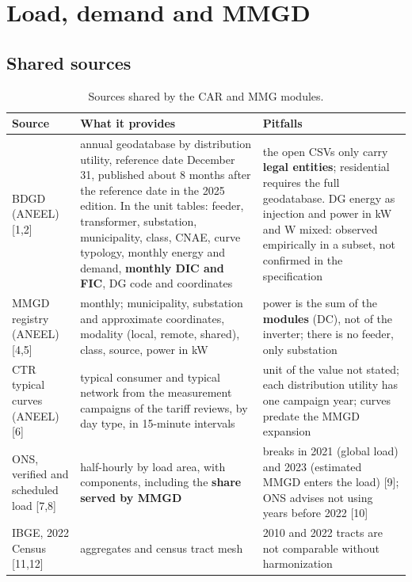 
\section{Load, demand and MMGD}

\subsection*{Shared sources}

\begin{table}[H]
\centering\small
\caption{Sources shared by the CAR and MMG modules.}
\begin{tabularx}{\textwidth}{P{3.2cm} L P{4.2cm}}
\toprule
\textbf{Source} & \textbf{What it provides} & \textbf{Pitfalls} \\
\midrule
BDGD (ANEEL) [1,2] & annual geodatabase by distribution utility, reference date December 31, published about 8 months after the reference date in the 2025 edition. In the unit tables: feeder, transformer, substation, municipality, class, CNAE, curve typology, monthly energy and demand, \textbf{monthly DIC and FIC}, DG code and coordinates & the open CSVs only carry \textbf{legal entities}; residential requires the full geodatabase. DG energy as injection and power in kW and W mixed: observed empirically in a subset, not confirmed in the specification \\
MMGD registry (ANEEL) [4,5] & monthly; municipality, substation and approximate coordinates, modality (local, remote, shared), class, source, power in kW & power is the sum of the \textbf{modules} (DC), not of the inverter; there is no feeder, only substation \\
CTR typical curves (ANEEL) [6] & typical consumer and typical network from the measurement campaigns of the tariff reviews, by day type, in 15-minute intervals & unit of the value not stated; each distribution utility has one campaign year; curves predate the MMGD expansion \\
ONS, verified and scheduled load [7,8] & half-hourly by load area, with components, including the \textbf{share served by MMGD} & breaks in 2021 (global load) and 2023 (estimated MMGD enters the load) [9]; ONS advises not using years before 2022 [10] \\
IBGE, 2022 Census [11,12] & aggregates and census tract mesh & 2010 and 2022 tracts are not comparable without harmonization \\

\end{tabularx}
\end{table}
